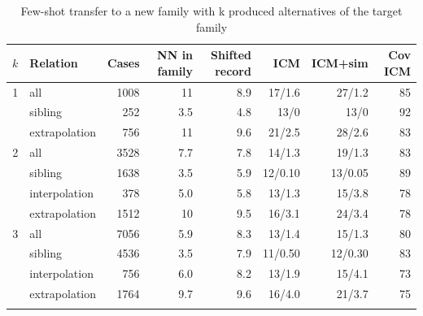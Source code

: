 \documentclass[pdflatex,sn-basic]{sn-jnl}
\newcommand{\tabsizesmall}{\footnotesize}
\begin{document}
\begin{table}[p]
\tabsizesmall
\setlength{\tabcolsep}{3pt}
\caption{Few-shot transfer to a new family with k produced alternatives of the target family}\label{tab:s-fewshot}
\begin{tabular}{@{}rlrrrrrr@{}}
\toprule
$k$ & Relation & Cases & NN in family & Shifted record & ICM & ICM+sim & Cov ICM \\
\midrule
1 & all & 1008 & 11 & 8.9 & 17/1.6 & 27/1.2 & 85 \\
 & sibling & 252 & 3.5 & 4.8 & 13/0 & 13/0 & 92 \\
 & extrapolation & 756 & 11 & 9.6 & 21/2.5 & 28/2.6 & 83 \\
2 & all & 3528 & 7.7 & 7.8 & 14/1.3 & 19/1.3 & 83 \\
 & sibling & 1638 & 3.5 & 5.9 & 12/0.10 & 13/0.05 & 89 \\
 & interpolation & 378 & 5.0 & 5.8 & 13/1.3 & 15/3.8 & 78 \\
 & extrapolation & 1512 & 10 & 9.5 & 16/3.1 & 24/3.4 & 78 \\
3 & all & 7056 & 5.9 & 8.3 & 13/1.4 & 15/1.3 & 80 \\
 & sibling & 4536 & 3.5 & 7.9 & 11/0.50 & 12/0.30 & 83 \\
 & interpolation & 756 & 6.0 & 8.2 & 13/1.9 & 15/4.1 & 73 \\
 & extrapolation & 1764 & 9.7 & 9.6 & 16/4.0 & 21/3.7 & 75 \\
\botrule
\end{tabular}
\end{table}
\end{document}
